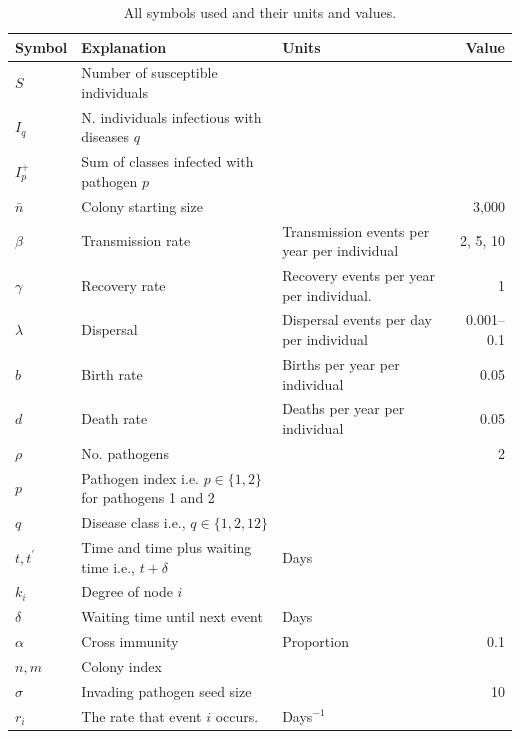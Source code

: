 \begin{table}[b!]
\centering
\caption[All symbols used.]{All symbols used and their units and values.}
\begin{tabular}{@{}lp{5cm}p{3.9cm}r@{}}
\toprule
Symbol & Explanation & Units & Value\\
\midrule
$S$ & Number of susceptible individuals &&\\
$I_q$ & N. individuals infectious with diseases $q$ &&\\
$I^+_p$ & Sum of classes infected with pathogen $p$ &\\
$\bar{n}$ & Colony starting size && 3,000\\
$\beta$ & Transmission rate & Transmission events per year per individual& 2, 5, 10\\
$\gamma$ & Recovery rate & Recovery events per year per individual. & 1\\
$\lambda$ & Dispersal & Dispersal events per day per individual& 0.001--0.1\\
$b$ & Birth rate & Births per year per individual& 0.05\\
$d$ & Death rate & Deaths per year per individual & 0.05\\
$\rho$ & No. pathogens && 2\\
$p$ &  Pathogen index i.e. $p\in\{1,2\}$ for pathogens 1 and 2 & &\\
$q$ & Disease class i.e., $q\in\{1,2,12\}$&\\
$t, t^\prime$ & Time and time plus waiting time i.e., $t+\delta$ & Days&\\
$k_i$ & Degree of node $i$ &&\\
$\delta$ & Waiting time until next event & Days&\\
$\alpha$ & Cross immunity & Proportion& 0.1\\
$n, m$ & Colony index &&\\
$\sigma$ & Invading pathogen seed size & & 10\\
$r_i$ & The rate that event $i$ occurs. & Days$^{-1}$&\\
\bottomrule
\end{tabular}

\label{t:params}
\end{table}





